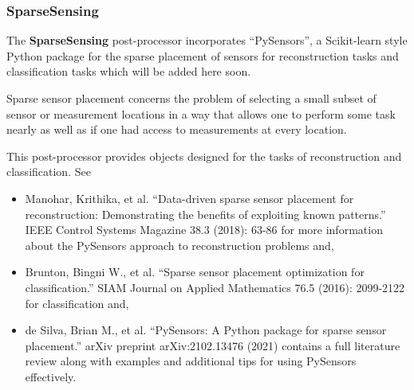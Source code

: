 \subsubsection{SparseSensing}
\label{SparseSensing}
The \textbf{SparseSensing} post-processor incorporates ``PySensors'', a Scikit-learn style Python package for the sparse placement of sensors for reconstruction tasks and classification tasks which will be added here soon.

Sparse sensor placement concerns the problem of selecting a small subset of sensor or measurement locations in a way that allows one to perform some task nearly as well as if one had access to measurements at every location.

This post-processor provides objects designed for the tasks of reconstruction and classification. See

\begin{itemize}
    \item Manohar, Krithika, et al. ``Data-driven sparse sensor placement for reconstruction: Demonstrating the benefits of exploiting known patterns.'' IEEE Control Systems Magazine 38.3 (2018): 63-86 for more information about the PySensors approach to reconstruction problems and,
    \item Brunton, Bingni W., et al. ``Sparse sensor placement optimization for classification.'' SIAM Journal on Applied Mathematics 76.5 (2016): 2099-2122 for classification and,
    \item de Silva, Brian M., et al. ``PySensors: A Python package for sparse sensor placement.'' arXiv preprint arXiv:2102.13476 (2021) contains a full literature review along with examples and additional tips for using PySensors effectively.
\end{itemize}

